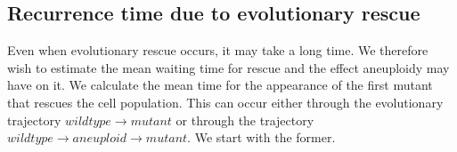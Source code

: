 \documentclass[12pt]{extarticle}
\begin{document}
%


\subsection*{Recurrence time due to evolutionary rescue}

Even when evolutionary rescue occurs, it may take a long time.
We therefore wish to estimate the mean waiting time for rescue and the effect aneuploidy may have on it. 
We calculate the mean time for the appearance of the first mutant that rescues the cell population.
This can occur either through the evolutionary trajectory $wildtype \rightarrow mutant$ or through the trajectory $wildtype \rightarrow aneuploid \rightarrow mutant$.
We start with the former. 
\end{document}
